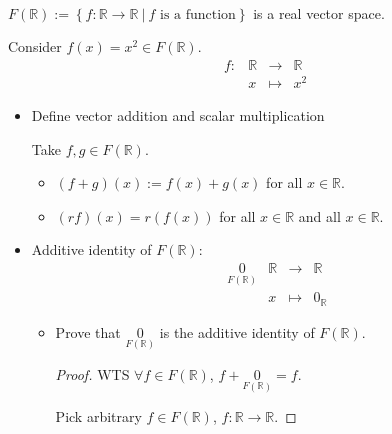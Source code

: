 \documentclass[11pt,fleqn]{book} %
\begin{document}
\begin{example}
{~~~}

    $F(\mathbb{R}) := \left\{ f:\mathbb{R} \to \mathbb{R} ~|~f \text{ is a function} \right\}$ is a real vector space.

    Consider $f(x) = x^2 \in F(\mathbb{R})$.
    $$\begin{matrix} &f: &\mathbb{R} &\to &\mathbb{R} \\& &x &\mapsto &x^2 \end{matrix}$$
    \begin{center}
    \end{center}

    \begin{itemize}
        \item Define vector addition and scalar multiplication

        Take $f,g \in F(\mathbb{R})$.
        \begin{itemize}
            \item $(f+g)(x):=f(x)+g(x)$ for all $x \in \mathbb{R}$.

            \item $(rf)(x)=r\left(f(x)\right)$ for all $x \in \mathbb{R}$ and all $x \in \mathbb{R}$.
        \end{itemize}

        \item Additive identity of $F(\mathbb{R})$:
        $$\begin{matrix} &\underset{F(\mathbb{R})}{0} &\mathbb{R} &\to &\mathbb{R} \\& &x &\mapsto &0_{\mathbb{R}} \end{matrix}$$

        \begin{itemize}
            \item Prove that $\underset{F(\mathbb{R})}{0}$ is the additive identity of $F(\mathbb{R})$.

            \begin{proof}
                WTS $\forall f \in F(\mathbb{R})$, $f+\underset{F(\mathbb{R})}{0} = f$.

                Pick arbitrary $f \in F(\mathbb{R})$, $f: \mathbb{R} \to \mathbb{R}$.


\end{proof}
\end{itemize}
\end{itemize}
\end{example}
\end{document}

